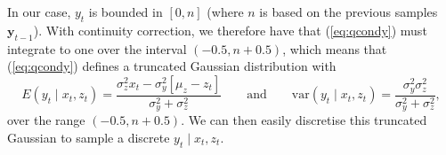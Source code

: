 \documentclass[a4paper]{article}
\newcommand{\by}{\bm{y}}
\newcommand{\bA}{\bm{A}}
\begin{document}
In our case, $y_t$ is bounded in $[0, n]$ (where $n$ is based on the previous samples $\by_{t - 1}$). With continuity correction, we therefore have that (\ref{eq:qcondy}) must integrate to one over the interval $(-0.5, n + 0.5)$, which means that (\ref{eq:qcondy}) defines a truncated Gaussian distribution with
\begin{equation}
    E\left(y_t \mid x_t, z_t\right) = \frac{\sigma^2_z x_t - \sigma^2_y \left[\mu_z - z_t\right] }{\sigma^2_y + \sigma^2_z} \qquad \mbox{and} \qquad \mbox{var}\left(y_t \mid x_t, z_t\right) = \frac{\sigma^2_y\sigma^2_z}{\sigma^2_y + \sigma^2_z},\label{eq:condexp}
\end{equation}
over the range $(-0.5, n + 0.5)$. We can then easily discretise this truncated Gaussian to sample a discrete $y_t \mid x_t, z_t$.
% 
\end{document}
